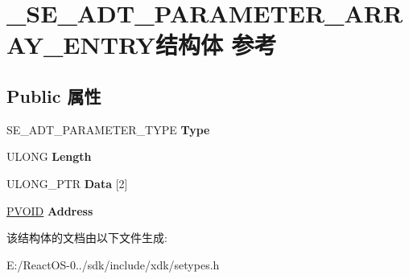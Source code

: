 \hypertarget{struct___s_e___a_d_t___p_a_r_a_m_e_t_e_r___a_r_r_a_y___e_n_t_r_y}{}\section{\+\_\+\+S\+E\+\_\+\+A\+D\+T\+\_\+\+P\+A\+R\+A\+M\+E\+T\+E\+R\+\_\+\+A\+R\+R\+A\+Y\+\_\+\+E\+N\+T\+R\+Y结构体 参考}
\label{struct___s_e___a_d_t___p_a_r_a_m_e_t_e_r___a_r_r_a_y___e_n_t_r_y}
\subsection*{Public 属性}
\begin{DoxyCompactItemize}
\item 
\mbox{\label{struct___s_e___a_d_t___p_a_r_a_m_e_t_e_r___a_r_r_a_y___e_n_t_r_y_abc1443a7a3f8defd4c56210ab573a3e1}} 
S\+E\+\_\+\+A\+D\+T\+\_\+\+P\+A\+R\+A\+M\+E\+T\+E\+R\+\_\+\+T\+Y\+PE {\bfseries Type}
\item 
\mbox{\label{struct___s_e___a_d_t___p_a_r_a_m_e_t_e_r___a_r_r_a_y___e_n_t_r_y_a621143e8f13b75d6fcf734a967d7e581}} 
U\+L\+O\+NG {\bfseries Length}
\item 
\mbox{\label{struct___s_e___a_d_t___p_a_r_a_m_e_t_e_r___a_r_r_a_y___e_n_t_r_y_a555e0fea01452065d630fba8677f0e37}} 
U\+L\+O\+N\+G\+\_\+\+P\+TR {\bfseries Data} \mbox{[}2\mbox{]}
\item 
\mbox{\label{struct___s_e___a_d_t___p_a_r_a_m_e_t_e_r___a_r_r_a_y___e_n_t_r_y_ac8316fa60f9a63836969706f431561cd}} 
\hyperlink{interfacevoid}{P\+V\+O\+ID} {\bfseries Address}
\end{DoxyCompactItemize}


该结构体的文档由以下文件生成\+:\begin{DoxyCompactItemize}
\item 
E\+:/\+React\+O\+S-\/0../sdk/include/xdk/setypes.\+h\end{DoxyCompactItemize}
